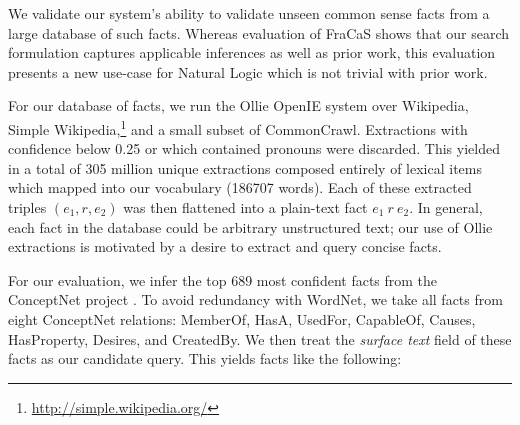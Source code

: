 %
%

\begin{table}
\begin{center}
  \caption{
    Accuracy inferring common-sense facts on a balanced test set.
    Lookup queries the lemmatized lower-case fact directly in the
      300M fact database.
    NaturalLI Only disallows such lookups, and infers every query from
      only unseen facts.
    NaturalLI + Lookup takes the union of the two systems.
    \label{tab:conceptnet}
  }
\end{center}
\end{table}

We validate our system's ability to validate unseen common sense facts
  from a large database of such facts.
Whereas evaluation of FraCaS shows that our search formulation captures
  applicable inferences as well as prior work, this evaluation presents
  a new use-case for Natural Logic which is not trivial with prior work.

For our database of facts, we run the Ollie OpenIE system
  \cite{key:2012mausam-ollie} over Wikipedia, Simple Wikipedia,\footnote{
    \url{http://simple.wikipedia.org/}
  }
  and a small subset of CommonCrawl.
Extractions with confidence below 0.25 or which contained
  pronouns were discarded.
This yielded in a total of 305 million unique extractions composed
  entirely of lexical items which mapped into our vocabulary
  (\num{186707} words).
Each of these extracted triples $(e_1,r,e_2)$ was then flattened into
  a plain-text fact $e_1~r~e_2$.
In general, each fact in the database could be arbitrary unstructured
  text; our use of Ollie extractions is motivated by a desire to
  extract and query concise facts.

For our evaluation, we infer the top 689 most confident facts from
  the ConceptNet project \cite{key:2011tandon-conceptnet}.
To avoid redundancy with WordNet, we take all facts from eight
  ConceptNet relations: 
    MemberOf,
    HasA,
    UsedFor,
    CapableOf,
    Causes,
    HasProperty,
    Desires, and 
    CreatedBy.
We then treat the \textit{surface text} field of these facts as our
  candidate query.
This yields facts like the following:

